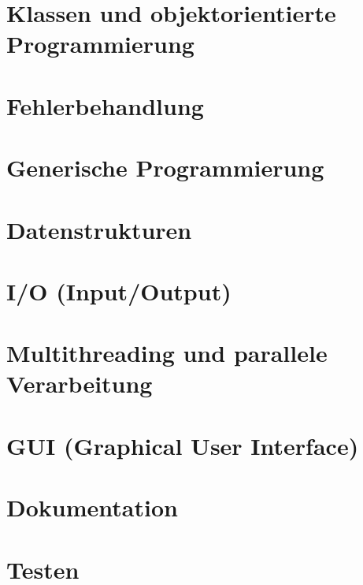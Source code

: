 \section{Klassen und objektorientierte Programmierung} \oopMark
	

\section{Fehlerbehandlung} \functionalMark \imperativeMark \oopMark
	

\section{Generische Programmierung} \functionalMark \imperativeMark \oopMark
	

\section{Datenstrukturen} \functionalMark \imperativeMark \oopMark
	

\section{I/O (Input/Output)} \functionalMark \imperativeMark \oopMark
	

\section{Multithreading und parallele Verarbeitung} \functionalMark \imperativeMark \oopMark
	

\section{GUI (Graphical User Interface)} \functionalMark \imperativeMark \oopMark
	

\section{Dokumentation} \functionalMark \imperativeMark \oopMark
	

\section{Testen} \functionalMark \imperativeMark \oopMark
	
